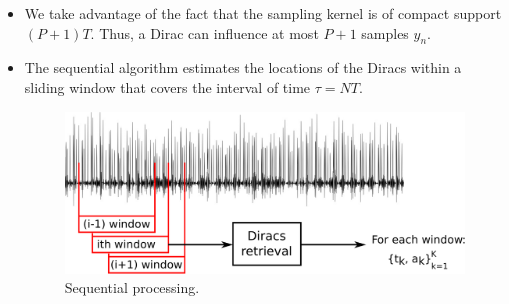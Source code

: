 \documentclass[8pt]{beamer}
\begin{document}
\begin{frame}

\begin{itemize}

\item We take advantage of the fact that the sampling kernel is of compact support $(P+1)T$. 
Thus, a Dirac can influence at most $P+1$ samples $y_n$.
\\[.2cm]

\item<2-> The sequential algorithm estimates the locations of the Diracs within a sliding
window that covers the interval of time $\tau = NT$.
\\[.2cm]

\begin{figure}[h]
\includegraphics[width=.6\linewidth]{figures/sliding_window}
\caption{Sequential processing.}
\end{figure}


\end{itemize}
\end{frame}
\end{document}
